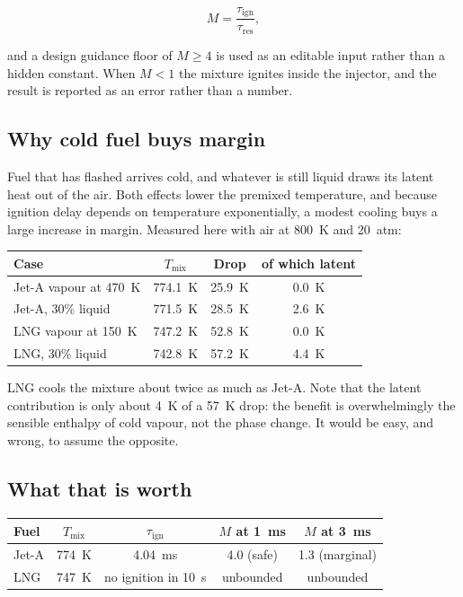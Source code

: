\documentclass[11pt]{article}
\begin{document}
\begin{equation}
  M=\frac{\tau_{\mathrm{ign}}}{\tau_{\mathrm{res}}},
  \label{eq:autoignition-margin}
\end{equation}

and a design guidance floor of $M\geq4$ is used as an editable input rather than a hidden
constant. When $M<1$ the mixture ignites inside the injector, and the result is reported
as an error rather than a number.

\subsection{Why cold fuel buys margin}

Fuel that has flashed arrives cold, and whatever is still liquid draws its latent heat out
of the air. Both effects lower the premixed temperature, and because ignition delay
depends on temperature exponentially, a modest cooling buys a large increase in margin.
Measured here with air at 800~K and 20~atm:

\begin{center}
\begin{tabular}{lccc}
\toprule
Case & $T_{\mathrm{mix}}$ & Drop & of which latent \\
\midrule
Jet-A vapour at 470~K & 774.1~K & 25.9~K & 0.0~K \\
Jet-A, 30\% liquid & 771.5~K & 28.5~K & 2.6~K \\
LNG vapour at 150~K & 747.2~K & 52.8~K & 0.0~K \\
LNG, 30\% liquid & 742.8~K & 57.2~K & 4.4~K \\
\bottomrule
\end{tabular}
\end{center}

LNG cools the mixture about twice as much as Jet-A. Note that the latent contribution is
only about 4~K of a 57~K drop: the benefit is overwhelmingly the sensible enthalpy of cold
vapour, not the phase change. It would be easy, and wrong, to assume the opposite.

\subsection{What that is worth}

\begin{center}
\begin{tabular}{lcccc}
\toprule
Fuel & $T_{\mathrm{mix}}$ & $\tau_{\mathrm{ign}}$ & $M$ at 1~ms & $M$ at 3~ms \\
\midrule
Jet-A & 774~K & 4.04~ms & 4.0 (safe) & 1.3 (marginal) \\
LNG & 747~K & no ignition in 10~s & unbounded & unbounded \\
\bottomrule
\end{tabular}
\end{center}
\end{document}
